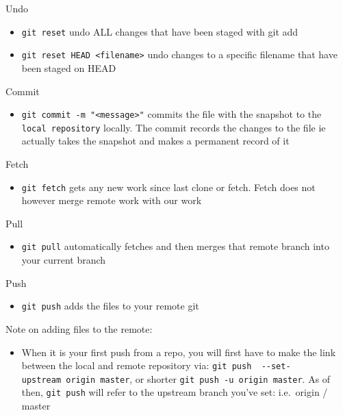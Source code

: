 \documentclass[]{book}
\providecommand{\tightlist}{%
  \setlength{\itemsep}{0pt}\setlength{\parskip}{0pt}}
\begin{document}
Undo

\begin{itemize}
\tightlist
\item
  \texttt{git\ reset} undo ALL changes that have been staged with git add
\item
  \texttt{git\ reset\ HEAD\ \textless{}filename\textgreater{}} undo changes to a specific filename that have been staged on HEAD
\end{itemize}

Commit

\begin{itemize}
\tightlist
\item
  \texttt{git\ commit\ -m\ "\textless{}message\textgreater{}"} commits the file with the snapshot to the \texttt{local\ repository} locally. The commit records the changes to the file ie actually takes the snapshot and makes a permanent record of it
\end{itemize}

Fetch

\begin{itemize}
\tightlist
\item
  \texttt{git\ fetch} gets any new work since last clone or fetch. Fetch does not however merge remote work with our work
\end{itemize}

Pull

\begin{itemize}
\tightlist
\item
  \texttt{git\ pull} automatically fetches and then merges that remote branch into your current branch
\end{itemize}

Push

\begin{itemize}
\tightlist
\item
  \texttt{git\ push} adds the files to your remote git
\end{itemize}

Note on adding files to the remote:

\begin{itemize}
\tightlist
\item
  When it is your first push from a repo, you will first have to make the link between the local and remote repository via: \texttt{git\ push\ \ -\/-set-upstream\ origin\ master}, or shorter \texttt{git\ push\ -u\ origin\ master}. As of then, \texttt{git\ push} will refer to the upstream branch you've set: i.e.~origin / master
\end{itemize}
\end{document}
